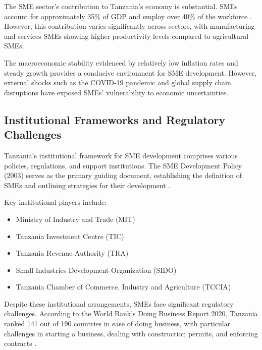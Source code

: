 The SME sector's contribution to Tanzania's economy is substantial. SMEs account for approximately 35\% of GDP and employ over 40\% of the workforce \citep{tanzania2022sme}. However, this contribution varies significantly across sectors, with manufacturing and services SMEs showing higher productivity levels compared to agricultural SMEs.

The macroeconomic stability evidenced by relatively low inflation rates and steady growth provides a conducive environment for SME development. However, external shocks such as the COVID-19 pandemic and global supply chain disruptions have exposed SMEs' vulnerability to economic uncertainties.

\subsection{Institutional Frameworks and Regulatory Challenges}

Tanzania's institutional framework for SME development comprises various policies, regulations, and support institutions. The SME Development Policy (2003) serves as the primary guiding document, establishing the definition of SMEs and outlining strategies for their development \citep{tanzania2003sme}.

Key institutional players include:
\begin{itemize}
    \item Ministry of Industry and Trade (MIT)
    \item Tanzania Investment Centre (TIC)
    \item Tanzania Revenue Authority (TRA)
    \item Small Industries Development Organization (SIDO)
    \item Tanzania Chamber of Commerce, Industry and Agriculture (TCCIA)
\end{itemize}

Despite these institutional arrangements, SMEs face significant regulatory challenges. According to the World Bank's Doing Business Report 2020, Tanzania ranked 141 out of 190 countries in ease of doing business, with particular challenges in starting a business, dealing with construction permits, and enforcing contracts \citep{worldbank2020doing}.

